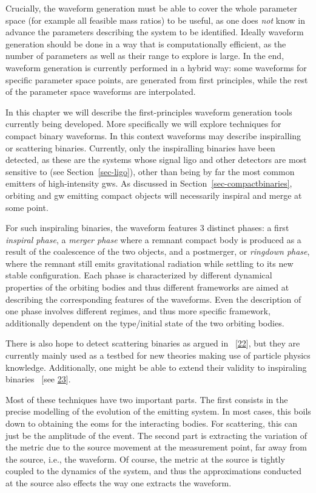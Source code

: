 \documentclass[
  11pt,
  a4paper,
  DIV=11,
  numbers=noendperiod,
  twoside]{scrreprt}
\DeclareRobustCommand{\[}{\begin{equation}}
\DeclareRobustCommand{\]}{\end{equation}}
\begin{document}
Crucially, the waveform generation must be able to cover the whole
parameter space (for example all feasible mass ratios) to be useful, as
one does \emph{not} know in advance the parameters describing the system
to be identified. Ideally waveform generation should be done in a way
that is computationally efficient, as the number of parameters as well
as their range to explore is large. In the end, waveform generation is
currently performed in a hybrid way: some waveforms for specific
parameter space points, are generated from first principles, while the
rest of the parameter space waveforms are interpolated.

In this chapter we will describe the first-principles waveform
generation tools currently being developed. More specifically we will
explore techniques for compact binary waveforms. In this context
waveforms may describe inspiralling or scattering binaries. Currently,
only the inspiralling binaries have been detected, as these are the
systems whose signal \gls{ligo} and other detectors are most sensitive
to (see Section~\ref{sec-ligo}), other than being by far the most common
emitters of high-intensity \glspl{gw}. As discussed in
Section~\ref{sec-compactbinaries}, orbiting and \gls{gw} emitting
compact objects will necessarily inspiral and merge at some point.

For such inspiraling binaries, the waveform features 3 distinct phases:
a first \emph{inspiral phase}, a \emph{merger phase} where a remnant
compact body is produced as a result of the coalescence of the two
objects, and a postmerger, or \emph{ringdown phase}, where the remnant
still emits gravitational radiation while settling to its new stable
configuration. Each phase is characterized by different dynamical
properties of the orbiting bodies and thus different frameworks are
aimed at describing the corresponding features of the waveforms. Even
the description of one phase involves different regimes, and thus more
specific framework, additionally dependent on the type/initial state of
the two orbiting bodies.

There is also hope to detect scattering binaries as argued in
~{[}\protect\hyperlink{ref-Mukherjee:2020hnm}{22}{]}, but they are
currently mainly used as a testbed for new theories making use of
particle physics knowledge. Additionally, one might be able to extend
their validity to inspiraling binaries ~{[}see
\protect\hyperlink{ref-Kalin:2019rwq}{23}{]}.

Most of these techniques have two important parts. The first consists in
the precise modelling of the evolution of the emitting system. In most
cases, this boils down to obtaining the \glspl{eom} for the interacting
bodies. For scattering, this can just be the amplitude of the event. The
second part is extracting the variation of the metric due to the source
movement at the measurement point, far away from the source, i.e., the
waveform. Of course, the metric at the source is tightly coupled to the
dynamics of the system, and thus the approximations conducted at the
source also effects the way one extracts the waveform.
\end{document}
